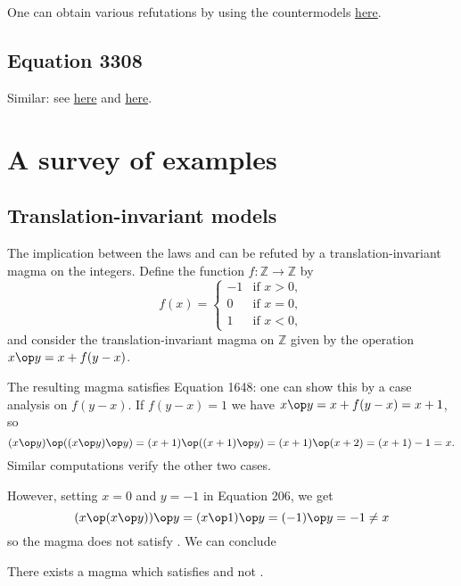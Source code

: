 One can obtain various refutations by using the countermodels \href{https://leanprover.zulipchat.com/#narrow/channel/458659-Equational/topic/713.2C.201289.2C.201447/near/483735768}{here}.
\subsection{Equation 3308}

Similar: see \href{https://leanprover.zulipchat.com/#narrow/channel/458659-Equational/topic/713.2C.201289.2C.201447/near/482066500}{here} and \href{https://leanprover.zulipchat.com/#narrow/channel/458659-Equational/topic/713.2C.201289.2C.201447/near/483735768}{here}.


\section{A survey of examples}\label{infinite-examples-section}

\subsection{Translation-invariant models}

The implication between the laws  and  can be refuted by a translation-invariant
magma on the integers. Define the function $f: \mathbb{Z} \to \mathbb{Z}$ by
$$f(x) =
\begin{cases}
  -1  & \text{if } x > 0, \\
   0  & \text{if } x = 0, \\
   1  & \text{if } x < 0,
\end{cases}$$
and consider the translation-invariant magma on $\mathbb{Z}$ given by the operation $x \op y = x + f(y-x)$.

The resulting magma satisfies Equation 1648: one can show this by a case analysis on $f(y-x)$. If $f(y-x)=1$ we have $x \op y = x + f(y-x) = x + 1$, so
$$(x \op y) \op ((x \op y) \op y) = (x + 1) \op ((x + 1) \op y) = (x + 1) \op (x + 2) = (x + 1) - 1 = x.$$
Similar computations verify the other two cases.

However, setting $x=0$ and $y=-1$ in Equation 206, we get
$$(x \op (x \op y)) \op y = (x \op 1) \op y = (-1) \op y = -1 \neq x$$
so the magma does not satisfy . We can conclude

\begin{theorem}\label{non_imp_1648_206_thm}
  \leanok
  There exists a magma which satisfies  and not .
\end{theorem}

